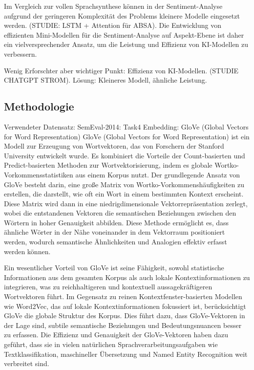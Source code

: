 \documentclass[12pt]{article}
\begin{document}
Im Vergleich zur vollen Sprachsynthese können in der Sentiment-Analyse aufgrund der geringeren Komplexität des Problems kleinere Modelle eingesetzt werden. 
(STUDIE: LSTM + Attention für ABSA). Die Entwicklung von effizienten Mini-Modellen für die Sentiment-Analyse auf Aspekt-Ebene ist daher ein vielversprechender Ansatz,
um die Leistung und Effizienz von KI-Modellen zu verbessern.


Wenig Erforschter aber wichtiger Punkt: Effizienz von KI-Modellen. (STUDIE CHATGPT STROM). Lösung: Kleineres Modell, ähnliche Leistung.
\subsection{Methodologie}

Verwendeter Datensatz: SemEval-2014: Task4
Embedding: GloVe (Global Vectors for Word Representation)
GloVe (Global Vectors for Word Representation) ist ein Modell zur Erzeugung von Wortvektoren, das von Forschern der Stanford University entwickelt wurde. Es kombiniert die Vorteile der Count-basierten und Predict-basierten Methoden zur Wortvektorisierung, indem es globale Wortko-Vorkommensstatistiken aus einem Korpus nutzt. Der grundlegende Ansatz von GloVe besteht darin, eine große Matrix von Wortko-Vorkommenshäufigkeiten zu erstellen, die darstellt, wie oft ein Wort in einem bestimmten Kontext erscheint. Diese Matrix wird dann in eine niedrigdimensionale Vektorrepräsentation zerlegt, wobei die entstandenen Vektoren die semantischen Beziehungen zwischen den Wörtern in hoher Genauigkeit abbilden. Diese Methode ermöglicht es, dass ähnliche Wörter in der Nähe voneinander in dem Vektorraum positioniert werden, wodurch semantische Ähnlichkeiten und Analogien effektiv erfasst werden können.

Ein wesentlicher Vorteil von GloVe ist seine Fähigkeit, sowohl statistische Informationen aus dem gesamten Korpus als auch lokale Kontextinformationen 
zu integrieren, was zu reichhaltigeren und kontextuell aussagekräftigeren Wortvektoren führt. Im Gegensatz zu reinen Kontextfenster-basierten Modellen 
wie Word2Vec, das auf lokale Kontextinformationen fokussiert ist, berücksichtigt GloVe die globale Struktur des Korpus. Dies führt dazu, dass 
GloVe-Vektoren in der Lage sind, subtile semantische Beziehungen und Bedeutungsnuancen besser zu erfassen. Die Effizienz und Genauigkeit der 
GloVe-Vektoren haben dazu geführt, dass sie in vielen natürlichen Sprachverarbeitungsaufgaben wie Textklassifikation, maschineller Übersetzung und 
Named Entity Recognition weit verbreitet sind.
\end{document}
